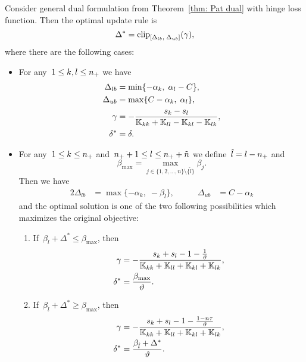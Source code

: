\begin{theorem}\label{thm:Update rule PatMat with hinge loss}
  Consider general dual formulation from Theorem~\ref{thm: Pat dual} with hinge loss function. Then the optimal update rule is
  \begin{equation*}
      \Delta^{*} = \clip{\Delta_{lb}}{\Delta_{ub}}{\gamma},
  \end{equation*}
  where there are the following cases:
  \begin{itemize}
    \item For any~$1\le k, l \le n_{+}$ we have
    \begin{align*}
      \Delta_{lb} & = \min\{- \alpha_k,\; \alpha_l - C\}, \\
      \Delta_{ub} & = \max\{C - \alpha_k,\; \alpha_l\}, \\
      \gamma      & = -\frac{s_k - s_l}{\mathbb{K}_{kk} + \mathbb{K}_{ll} - \mathbb{K}_{kl} - \mathbb{K}_{lk}}, \\
      \delta^{*}  & = \delta.
    \end{align*}

    \item For any~$1 \le k \le n_{+}$ and~$n_{+} + 1 \le l \le n_{+} + \tilde{n}$ we define~$\hat{l} = l - n_{+}$ and
    \begin{equation*}
      \beta_{\max}
        = \max_{j \in \{1, 2, \ldots, n\} \setminus \{\hat{l}\}} \beta_j.
    \end{equation*}
    Then we have
    \begin{alignat*}{2}
      \Delta_{lb} & = \max\{- \alpha_k,\; -\beta_{\hat{l}} \}, & \qquad
      \Delta_{ub} & = C - \alpha_k
    \end{alignat*}
    and the optimal solution is one of the two following possibilities which maximizes the original objective:
    \begin{enumerate}
      \item If~$\beta_{\hat{l}} + \Delta^{*} \leq \beta_{\max}$, then
      \begin{align*}
        \gamma & = -\frac{s_k + s_l - 1 - \frac{1}{\vartheta}}{\mathbb{K}_{kk} + \mathbb{K}_{ll} + \mathbb{K}_{kl} + \mathbb{K}_{lk}}, \\
        \delta^{*} & = \frac{\beta_{\max}}{\vartheta}.
      \end{align*}
      \item If~$\beta_{\hat{l}} + \Delta^{*} \ge \beta_{\max}$, then
      \begin{align*}
        \gamma & = -\frac{s_k + s_l - 1 - \frac{1 - n\tau}{\vartheta}}{\mathbb{K}_{kk} + \mathbb{K}_{ll} + \mathbb{K}_{kl} + \mathbb{K}_{lk}}, \\
        \delta^{*} & = \frac{\beta_{\hat{l}} + \Delta^{*}}{\vartheta}.
      \end{align*}
    \end{enumerate}


\end{itemize}
\end{theorem}
